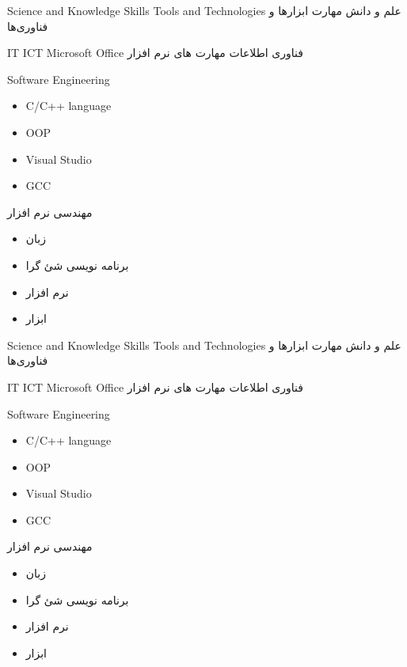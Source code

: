 
\craftC
{Science and Knowledge}
{Skills}
{Tools and Technologies}
{علم و دانش}
{مهارت}
{ابزارها و فناوری‌ها}
{}


\craftC
{IT}
{ICT}
{Microsoft Office}
{فناوری اطلاعات}
{مهارت های }
{نرم افزار }
{}


\craftC
{Software Engineering}
{\begin{itemize}
  \item C/C++ language
  \item OOP
\end{itemize}}
{\begin{itemize}
  \item Visual Studio
  \item GCC
\end{itemize}}
{مهندسی نرم افزار}
{\begin{itemize}
  \item زبان  
  \item برنامه نویسی شئ گرا
\end{itemize}}
{\begin{itemize}
  \item نرم افزار 
  \item ابزار 
\end{itemize}}
{}


\craftC
{Science and Knowledge}
{Skills}
{Tools and Technologies}
{علم و دانش}
{مهارت}
{ابزارها و فناوری‌ها}
{}


\craftC
{IT}
{ICT}
{Microsoft Office}
{فناوری اطلاعات}
{مهارت های }
{نرم افزار }
{}


\craftC
{Software Engineering}
{\begin{itemize}
  \item C/C++ language
  \item OOP
\end{itemize}}
{\begin{itemize}
  \item Visual Studio
  \item GCC
\end{itemize}}
{مهندسی نرم افزار}
{\begin{itemize}
  \item زبان  
  \item برنامه نویسی شئ گرا
\end{itemize}}
{\begin{itemize}
  \item نرم افزار 
  \item ابزار 
\end{itemize}}
{}

